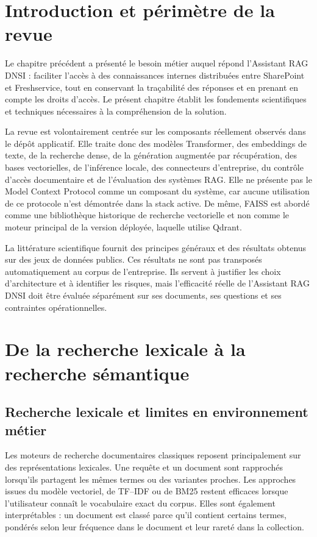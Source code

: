 \section{Introduction et périmètre de la revue}

Le chapitre précédent a présenté le besoin métier auquel répond l'Assistant RAG DNSI : faciliter l'accès à des connaissances internes distribuées entre SharePoint et Freshservice, tout en conservant la traçabilité des réponses et en prenant en compte les droits d'accès. Le présent chapitre établit les fondements scientifiques et techniques nécessaires à la compréhension de la solution.

La revue est volontairement centrée sur les composants réellement observés dans le dépôt applicatif. Elle traite donc des modèles Transformer, des embeddings de texte, de la recherche dense, de la génération augmentée par récupération, des bases vectorielles, de l'inférence locale, des connecteurs d'entreprise, du contrôle d'accès documentaire et de l'évaluation des systèmes RAG. Elle ne présente pas le Model Context Protocol comme un composant du système, car aucune utilisation de ce protocole n'est démontrée dans la stack active. De même, FAISS est abordé comme une bibliothèque historique de recherche vectorielle et non comme le moteur principal de la version déployée, laquelle utilise Qdrant.

La littérature scientifique fournit des principes généraux et des résultats obtenus sur des jeux de données publics. Ces résultats ne sont pas transposés automatiquement au corpus de l'entreprise. Ils servent à justifier les choix d'architecture et à identifier les risques, mais l'efficacité réelle de l'Assistant RAG DNSI doit être évaluée séparément sur ses documents, ses questions et ses contraintes opérationnelles.

\section{De la recherche lexicale à la recherche sémantique}

\subsection{Recherche lexicale et limites en environnement métier}

Les moteurs de recherche documentaires classiques reposent principalement sur des représentations lexicales. Une requête et un document sont rapprochés lorsqu'ils partagent les mêmes termes ou des variantes proches. Les approches issues du modèle vectoriel, de TF--IDF ou de BM25 restent efficaces lorsque l'utilisateur connaît le vocabulaire exact du corpus. Elles sont également interprétables : un document est classé parce qu'il contient certains termes, pondérés selon leur fréquence dans le document et leur rareté dans la collection.

